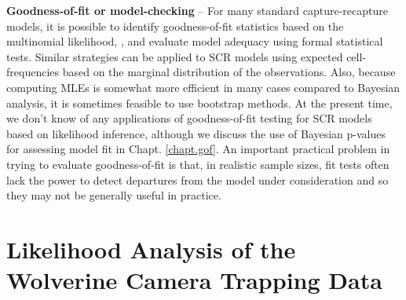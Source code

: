{\bf Goodness-of-fit or model-checking} -- For many standard
capture-recapture models, it is possible to identify goodness-of-fit
statistics based on the multinomial likelihood,
\citep[][Chapt. 5]{cooch_white:2006}, and evaluate model adequacy
using formal statistical tests. Similar strategies can be applied to
SCR models using expected cell-frequencies based on the marginal
distribution of the observations. Also, because computing MLEs is
somewhat more efficient in many cases compared to Bayesian analysis,
it is sometimes feasible to use bootstrap methods. At the present
time, we don't know of any applications of goodness-of-fit testing for
SCR models based on likelihood inference, although we discuss the use
of Bayesian p-values for assessing model fit in
Chapt. \ref{chapt.gof}. An important practical problem in trying to
evaluate goodness-of-fit is that, in realistic sample sizes, fit tests
often lack the power to detect departures from the model under
consideration and so they may not be generally useful in practice.


\section{Likelihood Analysis of the Wolverine Camera Trapping Data}
\label{mle.sec.wolverine}


